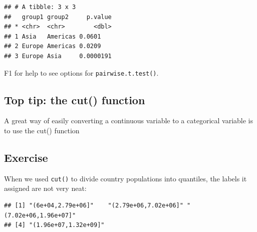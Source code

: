 \documentclass[]{book}
\makeatletter
\newenvironment{Shaded}{\begin{snugshade}}{\end{snugshade}}
\newcommand{\DataTypeTok}[1]{\textcolor[rgb]{0.13,0.29,0.53}{#1}}
\newcommand{\KeywordTok}[1]{\textcolor[rgb]{0.13,0.29,0.53}{\textbf{#1}}}
\newcommand{\NormalTok}[1]{#1}
\newcommand{\OperatorTok}[1]{\textcolor[rgb]{0.81,0.36,0.00}{\textbf{#1}}}
\newcommand{\StringTok}[1]{\textcolor[rgb]{0.31,0.60,0.02}{#1}}
\newenvironment{kframe}{%
\medskip{}
\setlength{\fboxsep}{.8em}
 \def\at@end@of@kframe{}%
 \ifinner\ifhmode%
  \def\at@end@of@kframe{\end{minipage}}%
  \begin{minipage}{\columnwidth}%
 \fi\fi%
 \def\FrameCommand##1{\hskip\@totalleftmargin \hskip-\fboxsep
 \colorbox{shadecolor}{##1}\hskip-\fboxsep
     \hskip-\linewidth \hskip-\@totalleftmargin \hskip\columnwidth}%
 \MakeFramed {\advance\hsize-\width
   \@totalleftmargin\z@ \linewidth\hsize
   \@setminipage}}%
 {\par\unskip\endMakeFramed%
 \at@end@of@kframe}
\renewenvironment{Shaded}{\begin{kframe}}{\end{kframe}}
\theoremstyle{definition}
\theoremstyle{definition}
\theoremstyle{definition}
\theoremstyle{remark}
\makeatother
\begin{document}
\begin{verbatim}
## # A tibble: 3 x 3
##   group1 group2     p.value
## * <chr>  <chr>        <dbl>
## 1 Asia   Americas 0.0601   
## 2 Europe Americas 0.0209   
## 3 Europe Asia     0.0000191
\end{verbatim}

F1 for help to see options for \texttt{pairwise.t.test()}.

\hypertarget{top-tip-the-cut-function}{%
\subsection{Top tip: the cut()
function}\label{top-tip-the-cut-function}}

A great way of easily converting a continuous variable to a categorical
variable is to use the cut() function

\begin{Shaded}
\end{Shaded}

\hypertarget{exercise-27}{%
\subsection{Exercise}\label{exercise-27}}

When we used \texttt{cut()} to divide country populations into
quantiles, the labels it assigned are not very neat:

\begin{Shaded}
\end{Shaded}

\begin{verbatim}
## [1] "(6e+04,2.79e+06]"    "(2.79e+06,7.02e+06]" "(7.02e+06,1.96e+07]"
## [4] "(1.96e+07,1.32e+09]"
\end{verbatim}
\end{document}
